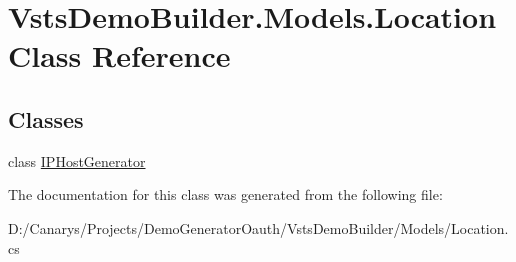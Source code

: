 \hypertarget{class_vsts_demo_builder_1_1_models_1_1_location}{}\section{Vsts\+Demo\+Builder.\+Models.\+Location Class Reference}
\label{class_vsts_demo_builder_1_1_models_1_1_location}
\subsection*{Classes}
\begin{DoxyCompactItemize}
\item 
class \mbox{\hyperlink{class_vsts_demo_builder_1_1_models_1_1_location_1_1_i_p_host_generator}{I\+P\+Host\+Generator}}
\end{DoxyCompactItemize}


The documentation for this class was generated from the following file\+:\begin{DoxyCompactItemize}
\item 
D\+:/\+Canarys/\+Projects/\+Demo\+Generator\+Oauth/\+Vsts\+Demo\+Builder/\+Models/Location.\+cs\end{DoxyCompactItemize}
